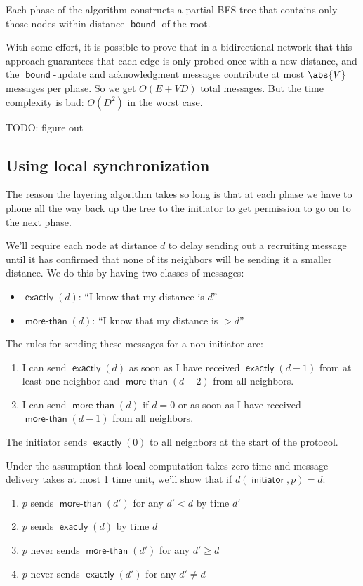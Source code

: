 \documentclass[11pt]{article}
\DeclareMathOperator{\initiator}{\textsf{initiator}}
\DeclareMathOperator{\bound}{\textsf{bound}}
\DeclareMathOperator{\exactly}{\textsf{exactly}}
\DeclareMathOperator{\morethan}{\textsf{more-than}}
\begin{document}
Each phase of the algorithm constructs a partial BFS tree that contains only those nodes within
distance \(\bound\) of the root.

With some effort, it is possible to prove that in a bidirectional network that this approach
guarantees that each edge is only probed once with a new distance, and the \(\bound\)-update and
acknowledgment messages contribute at most \(\abs{V}\) messages per phase. So we get \(O(E+VD)\) total
messages. But the time complexity is bad: \(O(D^2)\) in the worst case.

\label{Problem BFS} TODO: figure out
\subsection{Using local synchronization}
\label{sec:org433391d}
The reason the layering algorithm takes so long is that at each phase we have to phone all the way
back up the tree to the initiator to get permission to go on to the next phase.

We'll require each node at distance \(d\) to delay sending out a recruiting message until it has confirmed
that none of its neighbors will be sending it a smaller distance. We do this by having two classes of
messages:
\begin{itemize}
\item \(\exactly(d)\): ``I know that my distance is \(d\)''
\item \(\morethan(d)\): ``I know that my distance is \(>d\)''
\end{itemize}
The rules for sending these messages for a non-initiator are:
\begin{enumerate}
\item I can send \(\exactly(d)\) as soon as I have received \(\exactly(d-1)\) from at least one neighbor
and \(\morethan(d-2)\) from all neighbors.
\item I can send \(\morethan(d)\) if \(d=0\) or as soon as I have received \(\morethan(d-1)\) from all
neighbors.
\end{enumerate}

The initiator sends \(\exactly(0)\) to all neighbors at the start of the protocol.

\begin{proposition}[]
Under the assumption that local computation takes zero time and message delivery takes at most 1 time
unit, we'll show that if \(d(\initiator,p)=d\):
\begin{enumerate}
\item \(p\) sends \(\morethan(d')\) for any \(d'<d\) by time \(d'\)
\item \(p\) sends \(\exactly(d)\) by time \(d\)
\item \(p\) never sends \(\morethan(d')\) for any \(d'\ge d\)
\item \(p\) never sends \(\exactly(d')\) for any \(d'\neq d\)
\end{enumerate}
\end{proposition}
\end{document}
